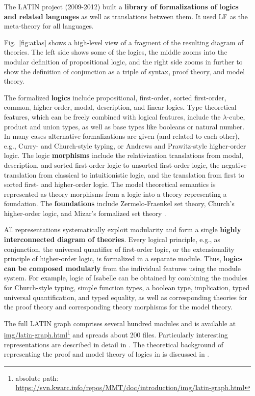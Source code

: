 The LATIN project \cite{CHKMR:latinabs:11,project:latin} (2009-2012) built a \textbf{library of formalizations of logics and related languages} as well as translations between them.
It used LF as the meta-theory for all languages.

Fig.~\ref{fig:atlas} shows a high-level view of a fragment of the resulting diagram of \mmt theories.
The left side shows some of the logics, the middle zooms into the modular definition of propositional logic, and the right side zooms in further to show the definition of conjunction as a triple of syntax, proof theory, and model theory.

The formalized \textbf{logics} include propositional, first-order, sorted first-order, common, higher-order, modal, description, and linear logics.
Type theoretical features, which can be freely combined with logical features, include the $\lambda$-cube, product and union types, as well as base types like booleans or natural number.
In many cases alternative formalizations are given (and related to each other), e.g., Curry- and Church-style typing, or Andrews and Prawitz-style higher-order logic.
The logic \textbf{morphisms} include the relativization translations from modal, description, and sorted first-order logic to unsorted first-order logic,
the negative translation from classical to intuitionistic logic, and the translation from first to sorted first- and higher-order logic.
The model theoretical semantics is represented as theory morphisms from a logic into a theory representing a foundation.
The \textbf{foundations} include Zermelo-Fraenkel set theory, Church's higher-order logic, and Mizar's formalized set theory \cite{mizar}.

All representations systematically exploit modularity and form a single \textbf{highly interconnected diagram of \mmt theories}.
Every logical principle, e.g., as conjunction, the universal quantifier of first-order logic, or the extensionality principle of higher-order logic, is formalized in a separate module.
Thus, \textbf{logics can be composed modularly} from the individual features using the {\mmt} module system.
For example, logic of Isabelle \cite{isabelle} can be obtained by combining the modules for Church-style typing, simple function types, a boolean type, implication, typed universal quantification, and typed equality, as well as corresponding theories for the proof theory and corresponding theory morphisms for the model theory.

The full LATIN graph comprises several hundred modules and is available at \url{img/latin-graph.html}\footnote{absolute path: \url{https://svn.kwarc.info/repos/MMT/doc/introduction/img/latin-graph.html}} and spreads about 200 files.
Particularly interesting representations are described in detail in \cite{IR:foundations:10,HR:folsound:10,BRS:tptphol:08}.
The theoretical background of representing the proof and model theory of logics in \mmt is discussed in \cite{rabe:combining:10,rabe:howto:14}.

